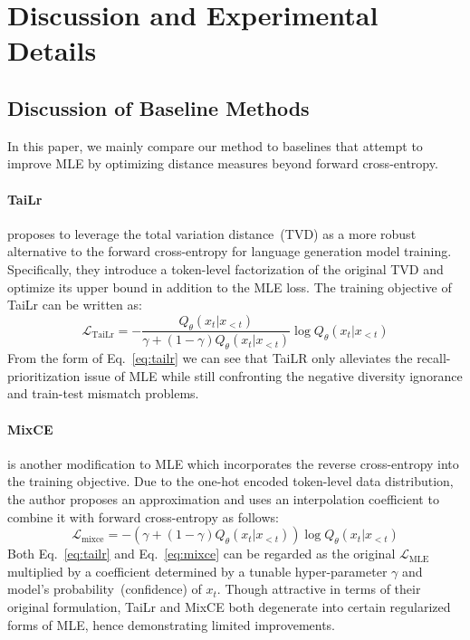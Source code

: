 \newpage
\appendix
\section{Discussion and Experimental Details}
\subsection{Discussion of Baseline Methods}
\label{appendix:baseline_detail}
In this paper, we mainly compare our method to baselines that attempt to improve MLE by optimizing distance measures beyond forward cross-entropy.
\paragraph{TaiLr} \cite{tailr} proposes to leverage the total variation distance~(TVD) as a more robust alternative to the forward cross-entropy for language generation model training. Specifically, they introduce a token-level factorization of the original TVD and optimize its upper bound in addition to the MLE loss. The training objective of TaiLr can be written as:
\begin{equation}
    \mathcal{L}_{\text{TaiLr}}=-\frac{Q_{\theta}(x_t|x_{<t})}{\gamma+(1-\gamma)Q_{\theta}(x_t|x_{<t})}\log{Q_{\theta}(x_t|x_{<t})}
    \label{eq:tailr}
\end{equation}
From the form of Eq.~\ref{eq:tailr} we can see that TaiLR only alleviates the recall-prioritization issue of MLE while still confronting the negative diversity ignorance and train-test mismatch problems.
\paragraph{MixCE} \cite{mixce} is another modification to MLE which incorporates the reverse cross-entropy into the training objective. Due to the one-hot encoded token-level data distribution, the author proposes an approximation and uses an interpolation coefficient to combine it with forward cross-entropy as follows:
\begin{equation}
    \mathcal{L}_{\text{mixce}}=-(\gamma+(1-\gamma)Q_{\theta}(x_t|x_{<t}))\log{Q_{\theta}(x_t|x_{<t})}
    \label{eq:mixce}
\end{equation}
Both Eq.~\ref{eq:tailr} and Eq.~\ref{eq:mixce} can be regarded as the original $\mathcal{L}_{\text{MLE}}$ multiplied by a coefficient determined by a tunable hyper-parameter $\gamma$ and model's probability~(confidence) of $x_t$. Though attractive in terms of their original formulation, TaiLr and MixCE both degenerate into certain regularized forms of MLE, hence demonstrating limited improvements.
